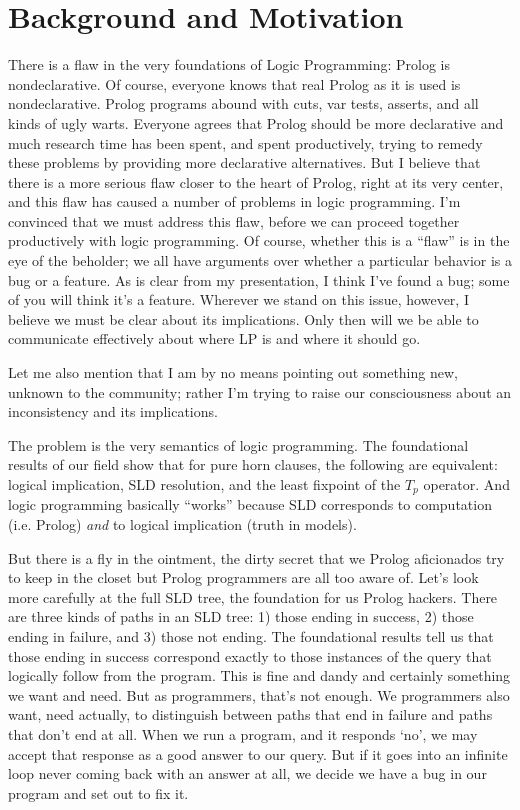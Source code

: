 \chapter{Background and Motivation}

There is a flaw in the very foundations of Logic Programming: Prolog
is nondeclarative.  Of course, everyone knows that real Prolog as it
is used is nondeclarative.  Prolog programs abound with cuts, var
tests, asserts, and all kinds of ugly warts.  Everyone agrees that
Prolog should be more declarative and much research time has been
spent, and spent productively, trying to remedy these problems by
providing more declarative alternatives.  But I believe that there is
a more serious flaw closer to the heart of Prolog, right at its very
center, and this flaw has caused a number of problems in logic
programming.  I'm convinced that we must address this flaw, before we
can proceed together productively with logic programming.  Of course,
whether this is a ``flaw'' is in the eye of the beholder; we all have
arguments over whether a particular behavior is a bug or a feature.
As is clear from my presentation, I think I've found a bug; some of
you will think it's a feature.  Wherever we stand on this issue,
however, I believe we must be clear about its implications.  Only then
will we be able to communicate effectively about where LP is and where
it should go.

Let me also mention that I am by no means pointing out something new,
unknown to the community; rather I'm trying to raise our consciousness
about an inconsistency and its implications.

The problem is the very semantics of logic programming.  The
foundational results of our field show that for pure horn clauses, the
following are equivalent: logical implication, SLD resolution, and the
least fixpoint of the $T_p$ operator.  And logic programming basically
``works'' because SLD corresponds to computation (i.e. Prolog) {\em
and} to logical implication (truth in models).

But there is a fly in the ointment, the dirty secret that we Prolog
aficionados try to keep in the closet but Prolog programmers are all
too aware of.  Let's look more carefully at the full SLD tree, the
foundation for us Prolog hackers.  There are three kinds of paths in
an SLD tree: 1) those ending in success, 2) those ending in failure,
and 3) those not ending.  The foundational results tell us that those
ending in success correspond exactly to those instances of the query
that logically follow from the program.  This is fine and dandy and
certainly something we want and need.  But as programmers, that's not
enough.  We programmers also want, need actually, to distinguish
between paths that end in failure and paths that don't end at all.
When we run a program, and it responds `no', we may accept that
response as a good answer to our query.  But if it goes into an
infinite loop never coming back with an answer at all, we decide we
have a bug in our program and set out to fix it.  

